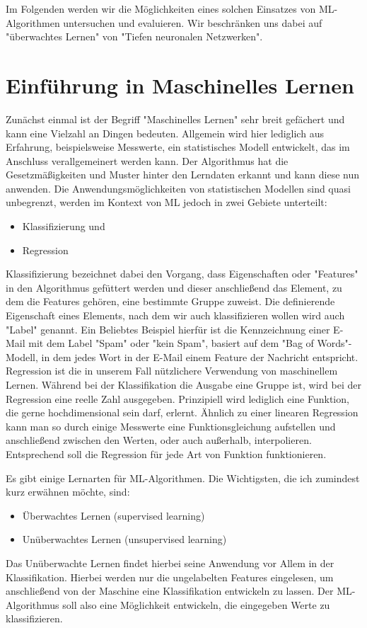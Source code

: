 Im Folgenden werden wir die Möglichkeiten eines solchen Einsatzes von ML-Algorithmen untersuchen und evaluieren. Wir beschränken uns dabei auf "überwachtes Lernen" von "Tiefen neuronalen Netzwerken". 
\section{Einführung in Maschinelles Lernen}
Zunächst einmal ist der Begriff "Maschinelles Lernen" sehr breit gefächert und kann eine Vielzahl an Dingen bedeuten. Allgemein wird hier lediglich aus Erfahrung, beispielsweise Messwerte, ein statistisches Modell entwickelt, das im Anschluss verallgemeinert werden kann. Der Algorithmus hat die Gesetzmäßigkeiten und Muster hinter den Lerndaten erkannt und kann diese nun anwenden. Die Anwendungsmöglichkeiten von statistischen Modellen sind quasi unbegrenzt, werden im Kontext von ML jedoch in zwei Gebiete unterteilt:
\begin{itemize}
	\item Klassifizierung und
	\item Regression
\end{itemize}
Klassifizierung bezeichnet dabei den Vorgang, dass Eigenschaften oder "Features" in den Algorithmus gefüttert werden und dieser anschließend das Element, zu dem die Features gehören, eine bestimmte Gruppe zuweist. Die definierende Eigenschaft eines Elements, nach dem wir auch klassifizieren wollen wird auch "Label" genannt. Ein Beliebtes Beispiel hierfür ist die Kennzeichnung einer E-Mail mit dem Label "Spam" oder "kein Spam", basiert auf dem "Bag of Words"-Modell, in dem jedes Wort in der E-Mail einem Feature der Nachricht entspricht. 
Regression ist die in unserem Fall nützlichere Verwendung von maschinellem Lernen. Während bei der Klassifikation die Ausgabe eine Gruppe ist, wird bei der Regression eine reelle Zahl ausgegeben. Prinzipiell wird lediglich eine Funktion, die gerne hochdimensional sein darf, erlernt. Ähnlich zu einer linearen Regression kann man so durch einige Messwerte eine Funktionsgleichung aufstellen und anschließend zwischen den Werten, oder auch außerhalb, interpolieren. Entsprechend soll die Regression für jede Art von Funktion funktionieren.

Es gibt einige Lernarten für ML-Algorithmen. Die Wichtigsten, die ich zumindest kurz erwähnen möchte, sind:
\begin{itemize}
	\item Überwachtes Lernen (supervised learning)
	\item Unüberwachtes Lernen (unsupervised learning)
\end{itemize}
Das Unüberwachte Lernen findet hierbei seine Anwendung vor Allem in der Klassifikation. Hierbei werden nur die ungelabelten Features eingelesen, um anschließend von der Maschine eine Klassifikation entwickeln zu lassen. Der ML-Algorithmus soll also eine Möglichkeit entwickeln, die eingegeben Werte zu klassifizieren. 

